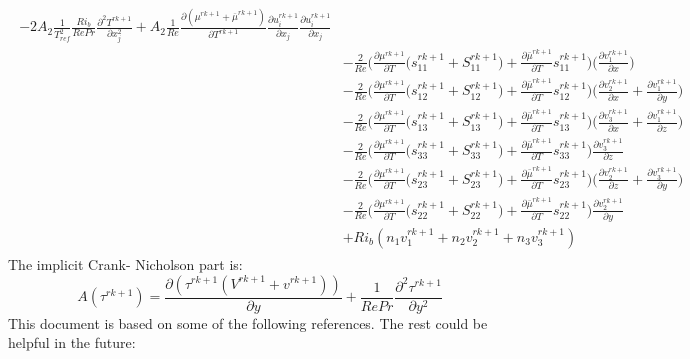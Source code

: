\documentclass[preprint,12pt]{article}
\begin{document}
\begin{align}
\begin{split}
-2A_2\frac{1}{T_{ref}^2}\frac{Ri_b}{Re Pr}\frac{\partial^2 T^{rk+1}}{\partial x_j^2}+A_2\frac{1}{Re}\frac{\partial (\mu^{rk+1}+\overline{\mu}^{rk+1})}{\partial T^{rk+1}}\frac{\partial u_{i}^{rk+1}}{\partial x_j}\frac{\partial u_{i}^{rk+1}}{\partial x_j}\\&-\frac{2}{Re}\Big(\frac{\partial\mu^{rk+1}}{\partial T}\big(s_{11}^{rk+1}+S_{11}^{rk+1}\big)+\frac{\partial\bar{\mu}^{rk+1}}{\partial T}s_{11}^{rk+1}\Big)\Bigg(\frac{\partial v_1^{rk+1}}{\partial x}\Bigg)\\&-\frac{2}{Re}\Big(\frac{\partial\mu^{rk+1}}{\partial T}\big(s_{12}^{rk+1}+S_{12}^{rk+1}\big)+\frac{\partial\bar{\mu}^{rk+1}}{\partial T}s_{12}^{rk+1}\Big)\Bigg(\frac{\partial v_2^{rk+1}}{\partial x}+\frac{\partial v_1^{rk+1}}{\partial y}\Bigg)\\&-\frac{2}{Re}\Big(\frac{\partial\mu^{rk+1}}{\partial T}\big(s_{13}^{rk+1}+S_{13}^{rk+1}\big)+\frac{\partial\bar{\mu}^{rk+1}}{\partial T}s_{13}^{rk+1}\Big)\Bigg(\frac{\partial v_3^{rk+1}}{\partial x}+\frac{\partial v_1^{rk+1}}{\partial z}\Bigg)\\&-\frac{2}{Re}\Big(\frac{\partial\mu^{rk+1}}{\partial T}\big(s_{33}^{rk+1}+S_{33}^{rk+1}\big)+\frac{\partial\bar{\mu}^{rk+1}}{\partial T}s_{33}^{rk+1}\Big)\frac{\partial v_3^{rk+1}}{\partial z}\\&-\frac{2}{Re}\Big(\frac{\partial\mu^{rk+1}}{\partial T}\big(s_{23}^{rk+1}+S_{23}^{rk+1}\big)+\frac{\partial\bar{\mu}^{rk+1}}{\partial T}s_{23}^{rk+1}\Big)\Bigg(\frac{\partial v_2^{rk+1}}{\partial z}+\frac{\partial v_3^{rk+1}}{\partial y}\Bigg)\\&-\frac{2}{Re}\Big(\frac{\partial\mu^{rk+1}}{\partial T}\big(s_{22}^{rk+1}+S_{22}^{rk+1}\big)+\frac{\partial\bar{\mu}^{rk+1}}{\partial T}s_{22}^{rk+1}\Big)\frac{\partial v_2^{rk+1}}{\partial y}\\&+Ri_b(n_1v_1^{rk+1}+n_2v_2^{rk+1}+n_3v_3^{rk+1})
\end{split}
\end{align}
The implicit Crank- Nicholson part is:
\begin{equation}
A(\tau^{rk+1})=\frac{\partial(\tau^{rk+1}(V^{rk+1}+v^{rk+1}))}{\partial y}+\frac{1}{RePr}\frac{\partial^2\tau^{rk+1}}{\partial y^2}
\end{equation}
\pagebreak
This document is based on some of the following references. The rest could be helpful in the future: \cite{kaminski2014transient,pringle2012minimal,eaves2015disruption,kaminski2017nonlinear,rabin2012triggering,winters1995available,turbulent_energy,turbulent_energy2,govindarajan2014instabilities,stratified_Instabilities,boussinesq1,marcotte2017optimal,nabi2017adjoint,notes_set,notes_set2,kundu2008fluid}


\end{document}
